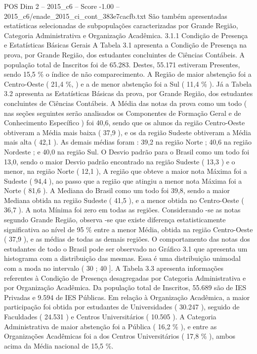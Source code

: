 \begin{textsample}{POS Dim 2 – 2015\_c6 – Score -1.00 – 2015\_c6/enade\_2015\_ci\_cont\_383e7cacfb.txt}
São também apresentadas estatísticas selecionadas de subpopulações caracterizadas por Grande Região, Categoria Administrativa e Organização Acadêmica. 3.1.1 Condição de Presença e Estatísticas Básicas Gerais A Tabela 3.1 apresenta a Condição de Presença na prova, por Grande Região, dos estudantes concluintes de Ciências Contábeis.
A população total de Inscritos foi de 65.283.
Destes, 55.171 estiveram Presentes, sendo 15,5 \% o índice de não comparecimento.
A Região de maior abstenção foi a Centro-Oeste ( 21,4 \%, ) e a de menor abstenção foi a Sul ( 11,4 \% ).
Já a Tabela 3.2 apresenta as Estatísticas Básicas da prova, por Grande Região, dos estudantes concluintes de Ciências Contábeis.
A Média das notas da prova como um todo ( nas seções seguintes serão analisados os Componentes de Formação Geral e de Conhecimento Específico ) foi 40,6, sendo que os alunos da região Centro-Oeste obtiveram a Média mais baixa ( 37,9 ), e os da região Sudeste obtiveram a Média mais alta ( 42,1 ).
As demais médias foram : 39,2 na região Norte ; 40,6 na região Nordeste ; e 40,0 na região Sul.
O Desvio padrão para o Brasil como um todo foi 13,0, sendo o maior Desvio padrão encontrado na região Sudeste ( 13,3 ) e o menor, na região Norte ( 12,1 ), A região que obteve a maior nota Máxima foi a Sudeste ( 94,4 ), ao passo que a região que atingiu a menor nota Máxima foi a Norte ( 81,6 ).
A Mediana do Brasil como um todo foi 39,8, sendo a maior Mediana obtida na região Sudeste ( 41,5 ), e a menor obtida no Centro-Oeste ( 36,7 ).
A nota Mínima foi zero em todas as regiões.
Considerando -se as notas segundo Grande Região, observa -se que existe diferença estatisticamente significativa ao nível de 95 \% entre a menor Média, obtida na região Centro-Oeste ( 37,9 ), e as médias de todas as demais regiões.
O comportamento das notas dos estudantes de todo o Brasil pode ser observado no Gráfico 3.1 que apresenta um histograma com a distribuição das mesmas.
Essa é uma distribuição unimodal com a moda no intervalo ( 30 ; 40 ].
A Tabela 3.3 apresenta informações referentes à Condição de Presença desagregadas por Categoria Administrativa e por Organização Acadêmica.
Da população total de Inscritos, 55.689 são de IES Privadas e 9.594 de IES Públicas.
Em relação à Organização Acadêmica, a maior participação foi obtida por estudantes de Universidades ( 30.247 ), seguido de Faculdades ( 24.531 ) e Centros Universitários ( 10.505 ).
A Categoria Administrativa de maior abstenção foi a Pública ( 16,2 \% ), e entre as Organizações Acadêmicas foi a dos Centros Universitários ( 17,8 \% ), ambos acima da Média nacional de 15,5 \%.

\end{textsample}
